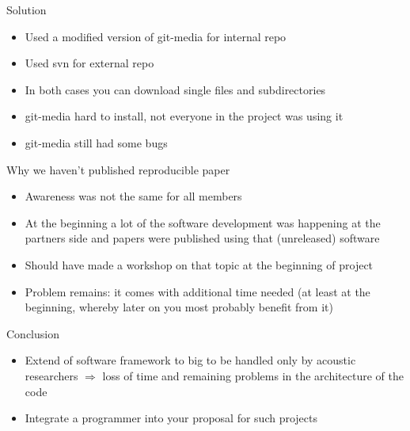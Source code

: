 \documentclass{beamer}
\begin{document}
\begin{frame}{Solution}

    \begin{itemize}
        \item Used a modified version of git-media for internal repo
        \item Used svn for external repo
        \item In both cases you can download single files and subdirectories
        \item git-media hard to install, not everyone in the project was using
            it
        \item git-media still had some bugs
    \end{itemize}

\end{frame}

\begin{frame}{Why we haven't published reproducible paper}

    \begin{itemize}
        \item Awareness was not the same for all members
        \item At the beginning a lot of the software development was happening
            at the partners side and papers were published using that
            (unreleased) software
        \item Should have made a workshop on that topic at the beginning of
            project
        \item Problem remains: it comes with additional time needed (at least at
            the beginning, whereby later on you most probably benefit from it)
    \end{itemize}

\end{frame}

\begin{frame}{Conclusion}

    \begin{itemize}
        \item Extend of software framework to big to be handled only by acoustic
            researchers $\Rightarrow$ loss of time and remaining problems in the
            architecture of the code
        \item Integrate a programmer into your proposal for such projects
    \end{itemize}

\end{frame}
\end{document}

